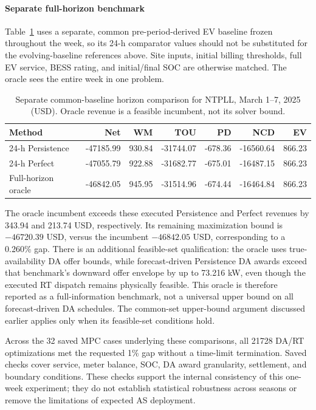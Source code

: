 \documentclass[final,5p,times]{elsarticle}
\begin{document}
\paragraph{Separate full-horizon benchmark}
Table~\ref{tab:weekly_horizon} uses a separate, common pre-period-derived EV
baseline frozen throughout the week, so its 24-h comparator values should
not be substituted for the evolving-baseline references above. Site inputs,
initial billing thresholds, full EV service, BESS rating, and initial/final
SOC are otherwise matched. The oracle sees the entire week in one problem.
\begin{table}[p]
\centering
\caption{Separate common-baseline horizon comparison for NTPLL, March 1--7, 2025 (USD). Oracle revenue is a feasible incumbent, not its solver bound.}
\label{tab:weekly_horizon}
\footnotesize
\setlength{\tabcolsep}{5pt}
\begin{tabular}{lrrrrrr}
\toprule
Method & Net & WM & TOU & PD & NCD & EV \\
\midrule
24-h Persistence & -47185.99 & 930.84 & -31744.07 & -678.36 & -16560.64 & 866.23 \\
24-h Perfect & -47055.79 & 922.88 & -31682.77 & -675.01 & -16487.15 & 866.23 \\
Full-horizon oracle & -46842.05 & 945.95 & -31514.96 & -674.44 & -16464.84 & 866.23 \\
\bottomrule
\end{tabular}
\end{table}

The oracle incumbent exceeds these executed Persistence and Perfect revenues
by 343.94 and 213.74 USD, respectively. Its remaining maximization bound is
$-46720.39$ USD, versus the incumbent $-46842.05$ USD, corresponding to a
0.260\% gap. There is an additional feasible-set qualification: the oracle
uses true-availability DA offer bounds, while forecast-driven Persistence DA
awards exceed that benchmark's downward offer envelope by up to 73.216 kW,
even though the executed RT dispatch remains physically feasible. This
oracle is therefore reported as a full-information benchmark, not a
universal upper bound on all forecast-driven DA schedules. The common-set
upper-bound argument discussed earlier applies only when its feasible-set
conditions hold.

Across the 32 saved MPC cases underlying these comparisons, all 21728 DA/RT
optimizations met the requested 1\% gap without a time-limit termination.
Saved checks cover service, meter balance, SOC, DA award granularity,
settlement, and boundary conditions. These checks support the internal
consistency of this one-week experiment; they do not establish statistical
robustness across seasons or remove the limitations of expected AS deployment.
\end{document}
